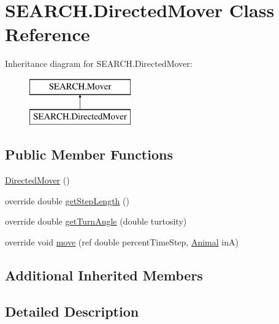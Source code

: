 \hypertarget{class_s_e_a_r_c_h_1_1_directed_mover}{\section{S\-E\-A\-R\-C\-H.\-Directed\-Mover Class Reference}
\label{class_s_e_a_r_c_h_1_1_directed_mover}
}


 


Inheritance diagram for S\-E\-A\-R\-C\-H.\-Directed\-Mover\-:\begin{figure}[H]
\begin{center}
\leavevmode
\includegraphics[height=2.000000cm]{class_s_e_a_r_c_h_1_1_directed_mover}
\end{center}
\end{figure}
\subsection*{Public Member Functions}
\begin{DoxyCompactItemize}
\item 
\hyperlink{class_s_e_a_r_c_h_1_1_directed_mover_a2cc387384dd525179200e71e50227527}{Directed\-Mover} ()
\item 
override double \hyperlink{class_s_e_a_r_c_h_1_1_directed_mover_ae103ba51cc5633f8f08a0f103869b446}{get\-Step\-Length} ()
\item 
override double \hyperlink{class_s_e_a_r_c_h_1_1_directed_mover_ac0ecb54d6c5b3c63d4959ce2ad5ba8b3}{get\-Turn\-Angle} (double turtosity)
\item 
override void \hyperlink{class_s_e_a_r_c_h_1_1_directed_mover_ac691f4b33dfc353cc0e5823649ecd874}{move} (ref double percent\-Time\-Step, \hyperlink{class_s_e_a_r_c_h_1_1_animal}{Animal} in\-A)
\end{DoxyCompactItemize}
\subsection*{Additional Inherited Members}


\subsection{Detailed Description}




